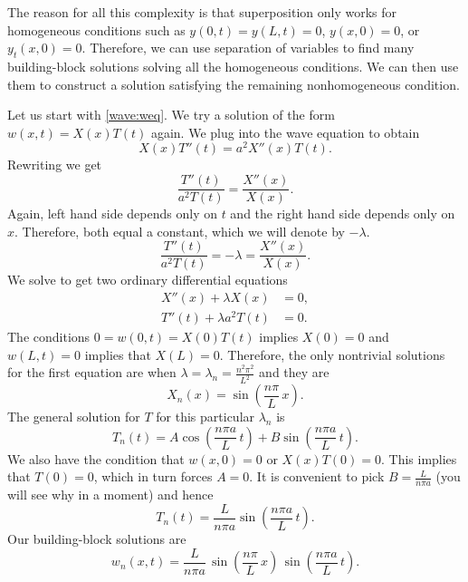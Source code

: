 The reason for all this complexity is that superposition only works for
homogeneous conditions such as
$y(0,t) = y(L,t) = 0$, $y(x,0) = 0$, or $y_t(x,0) = 0$.  Therefore,
we can
use separation of variables to find many building-block
solutions solving all the homogeneous conditions.  We can then use them to
construct a solution satisfying the remaining nonhomogeneous condition.

Let us start with \eqref{wave:weq}.
We try a solution of the form $w(x,t) = X(x) T(t)$ again.  We plug into
the wave equation to obtain
\begin{equation*}
X(x)T''(t) = a^2 X''(x) T(t) .
\end{equation*}
Rewriting we get
\begin{equation*}
\frac{T''(t)}{a^2 T(t)} = \frac{X''(x)}{X(x)} .
\end{equation*}
Again, left hand side depends only on $t$ and the right hand side depends
only on $x$.  Therefore, both equal a constant, which we will denote by
$-\lambda$.
\begin{equation*}
\frac{T''(t)}{a^2 T(t)} = -\lambda = \frac{X''(x)}{X(x)} .
\end{equation*}
We solve to get two ordinary differential equations
\begin{align*}
X''(x) + \lambda X(x) &= 0 , \\
T''(t) + \lambda a^2 T(t) &= 0 .
\end{align*}
The conditions $0 = w(0,t) = X(0) T(t)$ implies $X(0) = 0$ and
$w(L,t) = 0$ implies that $X(L) = 0$.  Therefore, the only nontrivial
solutions for the first equation are when
$\lambda = \lambda_n = \frac{n^2 \pi^2}{L^2}$ and they are
\begin{equation*}
X_n(x) = \sin \left( \frac{n \pi}{L} \, x \right) .
\end{equation*}
The general solution for $T$ for this particular $\lambda_n$ is
\begin{equation*}
T_n(t) = A \cos \left( \frac{n \pi a}{L} \, t \right)
+ B \sin \left( \frac{n \pi a}{L} \, t \right).
\end{equation*}
We also have the condition that $w(x,0) = 0$ or $X(x)T(0) = 0$.  This
implies that $T(0) = 0$, which in turn forces $A = 0$.  It is
convenient to pick $B=\frac{L}{n \pi a}$ (you will see why in a moment)
and hence
\begin{equation*}
T_n(t) = \frac{L}{n \pi a} \sin \left( \frac{n \pi a}{L} \, t \right).
\end{equation*}
Our building-block solutions are
\begin{equation*}
w_n(x,t) = 
\frac{L}{n \pi a} \,
\sin \left( \frac{n \pi}{L} \, x \right) \,
\sin \left( \frac{n \pi a}{L} \, t \right) .
\end{equation*}
